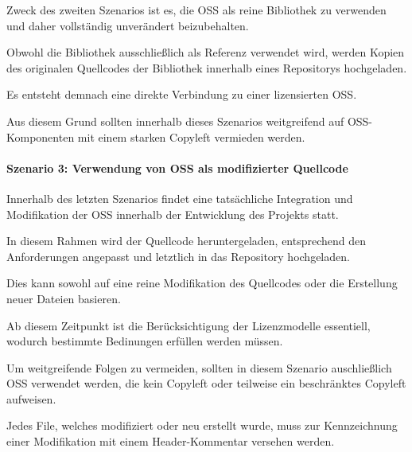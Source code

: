 Zweck des zweiten Szenarios ist es, die OSS als reine Bibliothek zu verwenden und daher vollständig unverändert beizubehalten. 

Obwohl die Bibliothek ausschließlich als Referenz verwendet wird, werden Kopien des originalen Quellcodes der Bibliothek innerhalb eines Repositorys hochgeladen.

Es entsteht demnach eine direkte Verbindung zu einer lizensierten OSS. 

Aus diesem Grund sollten innerhalb dieses Szenarios weitgreifend auf OSS-Komponenten mit einem starken Copyleft vermieden werden. 

\paragraph{Szenario 3: Verwendung von OSS als modifizierter Quellcode}

Innerhalb des letzten Szenarios findet eine tatsächliche Integration und Modifikation der OSS innerhalb der Entwicklung des Projekts statt.

In diesem Rahmen wird der Quellcode heruntergeladen, entsprechend den Anforderungen angepasst und letztlich in das Repository hochgeladen. 

Dies kann sowohl auf eine reine Modifikation des Quellcodes oder die Erstellung neuer Dateien basieren.  

Ab diesem Zeitpunkt ist die Berücksichtigung der Lizenzmodelle essentiell, wodurch bestimmte Bedinungen erfüllen werden müssen. 

Um weitgreifende Folgen zu vermeiden, sollten in diesem Szenario auschließlich OSS verwendet werden, die kein Copyleft oder teilweise ein beschränktes Copyleft aufweisen.

Jedes File, welches modifiziert oder neu erstellt wurde, muss zur Kennzeichnung einer Modifikation mit einem Header-Kommentar versehen werden.

